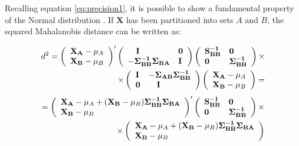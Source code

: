 \documentclass[openany]{book}
\begin{document}
Recalling equation \ref{eq:precision1}, it is possible to show a fundamental property of the Normal distribution \citep[][result 4.6]{JohnsonWichern}.
If $\mathbf{X}$ has been partitioned into sets $A$ and $B$, the squared Mahalanobis distance can be written as:
 
$$
 \begin{aligned}
	d^2 = 
	\left( \begin{array}{l} 
		\mathbf{X_A} - \mu_A\\
		\mathbf{X_B} - \mu_B
	\end{array} \right)'
	\left( \begin{array}{ll} 
		\quad \mathbf{I} & \mathbf{0}\\ 
		- \mathbf{\Sigma_{BB}^{-1}} \mathbf{\Sigma_{BA}} & \mathbf{I}
	\end{array}
	\right)
	\left( \begin{array}{ll} 
		\mathbf{S_{BB}^{-1}}   & \mathbf{0}\\ 
		\mathbf{0}  & \mathbf{\Sigma_{BB}^{-1}}
	\end{array} \right) \times
	\notag\\ \times
	\left( \begin{array}{ll} 
	\mathbf{I} & - \mathbf{\Sigma_{AB}} \mathbf{\Sigma_{BB}^{-1}}\\ 
	\mathbf{0} & \quad \mathbf{I} \quad
    \end{array} \right)
    \left( \begin{array}{l} 
    	\mathbf{X_A} - \mu_A\\
    	\mathbf{X_B} - \mu_B
    \end{array} \right)	 =
\end{aligned}
$$ 
$$ 
\begin{aligned}=
	\left( \begin{array}{l} 
	\mathbf{X_A} - \mu_A + (\mathbf{X_B} - \mu_B) \mathbf{\Sigma_{BB}^{-1}} \mathbf{\Sigma_{BA}}\\
	\mathbf{X_B} - \mu_B 
\end{array} \right)'
	\left( \begin{array}{ll} 
	\mathbf{S_{BB}^{-1}}   & \mathbf{0}\\ 
	\mathbf{0}  & \mathbf{\Sigma_{BB}^{-1}}
\end{array} \right) \times \\
\notag    \times
	\left( \begin{array}{l} 
	\mathbf{X_A} - \mu_A + (\mathbf{X_B} - \mu_B) \mathbf{\Sigma_{BB}^{-1}} \mathbf{\Sigma_{BA}}\\
	\mathbf{X_B} - \mu_B 
\end{array} \right)
\end{aligned}
$$ 
\end{document}
